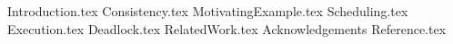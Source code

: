 \documentclass[acmtocs]{acmtrans2m}
\begin{document}
\maketitle

 {Introduction.tex}
 {Consistency.tex}
 {MotivatingExample.tex}
 {Scheduling.tex}
 {Execution.tex}
 {Deadlock.tex}
 {RelatedWork.tex}
 {Acknowledgements}
 {Reference.tex}
\end{document}

